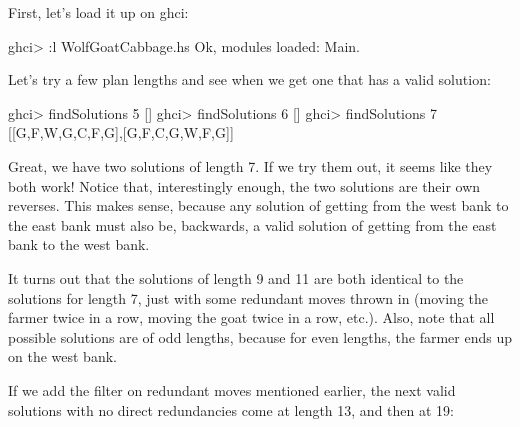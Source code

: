 \documentclass[]{article}
\newenvironment{Shaded}{}{}
\newcommand{\DataTypeTok}[1]{\textcolor[rgb]{0.56,0.13,0.00}{#1}}
\newcommand{\DecValTok}[1]{\textcolor[rgb]{0.25,0.63,0.44}{#1}}
\newcommand{\FunctionTok}[1]{\textcolor[rgb]{0.02,0.16,0.49}{#1}}
\newcommand{\NormalTok}[1]{#1}
\begin{document}
First, let's load it up on ghci:

\begin{Shaded}
\begin{Highlighting}[]
\NormalTok{ghci}\FunctionTok{>} \FunctionTok{:}\NormalTok{l WolfGoatCabbage.hs}
\DataTypeTok{Ok}\NormalTok{, modules loaded}\FunctionTok{:} \DataTypeTok{Main}\FunctionTok{.}
\end{Highlighting}
\end{Shaded}

Let's try a few plan lengths and see when we get one that has a valid solution:

\begin{Shaded}
\begin{Highlighting}[]
\NormalTok{ghci}\FunctionTok{>}\NormalTok{ findSolutions }\DecValTok{5}
\NormalTok{[]}
\NormalTok{ghci}\FunctionTok{>}\NormalTok{ findSolutions }\DecValTok{6}
\NormalTok{[]}
\NormalTok{ghci}\FunctionTok{>}\NormalTok{ findSolutions }\DecValTok{7}
\NormalTok{[[}\DataTypeTok{G}\NormalTok{,}\DataTypeTok{F}\NormalTok{,}\DataTypeTok{W}\NormalTok{,}\DataTypeTok{G}\NormalTok{,}\DataTypeTok{C}\NormalTok{,}\DataTypeTok{F}\NormalTok{,}\DataTypeTok{G}\NormalTok{],[}\DataTypeTok{G}\NormalTok{,}\DataTypeTok{F}\NormalTok{,}\DataTypeTok{C}\NormalTok{,}\DataTypeTok{G}\NormalTok{,}\DataTypeTok{W}\NormalTok{,}\DataTypeTok{F}\NormalTok{,}\DataTypeTok{G}\NormalTok{]]}
\end{Highlighting}
\end{Shaded}

Great, we have two solutions of length 7. If we try them out, it seems like they
both work! Notice that, interestingly enough, the two solutions are their own
reverses. This makes sense, because any solution of getting from the west bank
to the east bank must also be, backwards, a valid solution of getting from the
east bank to the west bank.

It turns out that the solutions of length 9 and 11 are both identical to the
solutions for length 7, just with some redundant moves thrown in (moving the
farmer twice in a row, moving the goat twice in a row, etc.). Also, note that
all possible solutions are of odd lengths, because for even lengths, the farmer
ends up on the west bank.

If we add the filter on redundant moves mentioned earlier, the next valid
solutions with no direct redundancies come at length 13, and then at 19:
\end{document}
